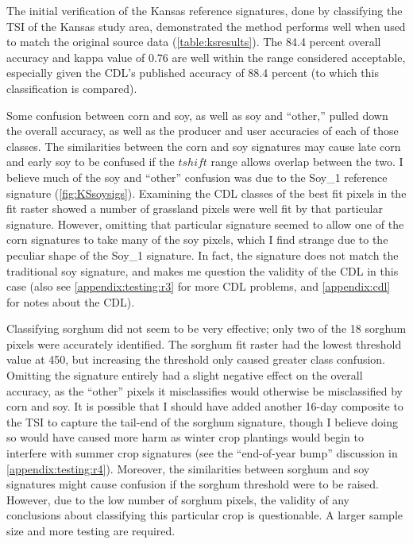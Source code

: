 The initial verification of the Kansas reference signatures, done by classifying the TSI of the Kansas study area, demonstrated the method performs well when used to match the original source data (\autoref{table:ksresults}). The 84.4 percent overall accuracy and kappa value of 0.76 are well within the range considered acceptable, especially given the CDL's published accuracy of 88.4 percent (to which this classification is compared).

Some confusion between corn and soy, as well as soy and ``other,'' pulled down the overall accuracy, as well as the producer and user accuracies of each of those classes. The similarities between the corn and soy signatures may cause late corn and early soy to be confused if the $tshift$ range allows overlap between the two. I believe much of the soy and ``other'' confusion was due to the Soy\_1 reference signature (\autoref{fig:KSsoysigs}). Examining the CDL classes of the best fit pixels in the fit raster showed a number of grassland pixels were well fit by that particular signature. However, omitting that particular signature seemed to allow one of the corn signatures to take many of the soy pixels, which I find strange due to the peculiar shape of the Soy\_1 signature. In fact, the signature does not match the traditional soy signature, and makes me question the validity of the CDL in this case (also see \autoref{appendix:testing:r3} for more CDL problems, and \autoref{appendix:cdl} for notes about the CDL).

Classifying sorghum did not seem to be very effective; only two of the 18 sorghum pixels were accurately identified. The sorghum fit raster had the lowest threshold value at 450, but increasing the threshold only caused greater class confusion. Omitting the signature entirely had a slight negative effect on the overall accuracy, as the ``other'' pixels it misclassifies would otherwise be misclassified by corn and soy. It is possible that I should have added another 16-day composite to the TSI to capture the tail-end of the sorghum signature, though I believe doing so would have caused more harm as winter crop plantings would begin to interfere with summer crop signatures (see the ``end-of-year bump'' discussion in \autoref{appendix:testing:r4}). Moreover, the similarities between sorghum and soy signatures might cause confusion if the sorghum threshold were to be raised. However, due to the low number of sorghum pixels, the validity of any conclusions about classifying this particular crop is questionable. A larger sample size and more testing are required.

